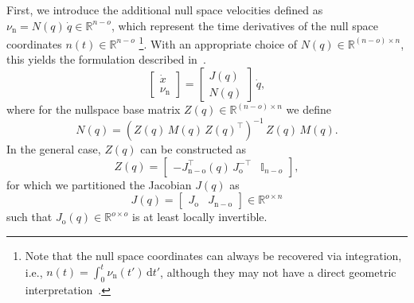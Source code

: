 First, we introduce the additional null space velocities defined as $\nu_\mathrm{n} = N(q) \, \dot{q} \in \mathbb{R}^{n-o}$, which represent the time derivatives of the null space coordinates $n(t) \in \mathbb{R}^{n-o}$ \footnote{Note that the null space coordinates can always be recovered via integration, i.e.,  $n(t) = \int_0^t \nu_\mathrm{n}(t{\prime}) \, \mathrm{d}t{\prime}$, although they may not have a direct geometric interpretation~\citep{ott2008cartesian}.}. With an appropriate choice of  $N(q) \in \mathbb{R}^{(n-o) \times n}$, this yields the formulation described in~\citep{ott2008cartesian, della2020model}.
\begin{equation}
    \begin{bmatrix}
        \dot{x}\\
        \nu_\mathrm{n}
    \end{bmatrix} = \begin{bmatrix}
        J(q)\\
        N(q)
    \end{bmatrix} \, \dot{q},
\end{equation}
where for the nullspace base matrix $Z(q) \in \mathbb{R}^{(n-o) \times n}$ we define~\citep{ott2008cartesian}
\begin{equation}
    N(q) = \left ( Z(q) \, M(q) \, Z(q)^\top \right )^{-1} \, Z(q) \, M(q).
\end{equation}
In the general case, $Z(q)$ can be constructed as~\citep{huang1991optimal, ott2008cartesian}
\begin{equation}
    Z(q) = \begin{bmatrix}
        -J_\mathrm{n-o}^\top(q) \, J_\mathrm{o}^{-\top} & \mathbb{I}_{n-o}
    \end{bmatrix},
\end{equation}
for which we partitioned the Jacobian $J(q)$ as 
\begin{equation}
    J(q) = \begin{bmatrix}
        J_\mathrm{o} & J_\mathrm{n-o}
    \end{bmatrix} \in \mathbb{R}^{o \times n}
\end{equation}
such that $J_\mathrm{o}(q) \in \mathbb{R}^{o \times o}$ is at least locally invertible.

